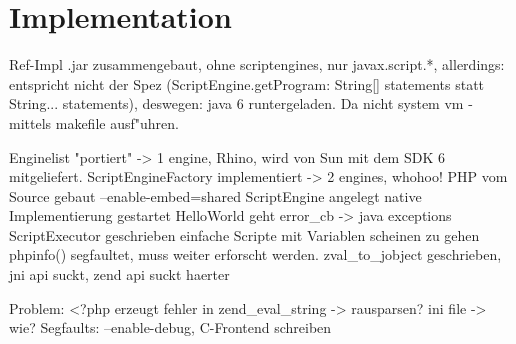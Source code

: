 
\section{Implementation}
\label{sec:chap1:impl}

Ref-Impl .jar zusammengebaut, ohne scriptengines, nur javax.script.*, allerdings: entspricht nicht der Spez 
(ScriptEngine.getProgram: String[] statements statt String... statements), deswegen: java 6 runtergeladen.
Da nicht system vm - mittels makefile ausf"uhren.

Enginelist "portiert" -> 1 engine, Rhino, wird von Sun mit dem SDK 6 mitgeliefert.
ScriptEngineFactory implementiert -> 2 engines, whohoo!
PHP vom Source gebaut --enable-embed=shared
ScriptEngine angelegt
native Implementierung gestartet
HelloWorld geht
error\_cb  -> java exceptions
ScriptExecutor geschrieben
einfache Scripte mit Variablen scheinen zu gehen
phpinfo() segfaultet, muss weiter erforscht werden.
zval\_to\_jobject geschrieben, jni api suckt, zend api suckt haerter


Problem: <?php erzeugt fehler in zend\_eval\_string -> rausparsen?
ini file -> wie?
Segfaults: --enable-debug, C-Frontend schreiben





